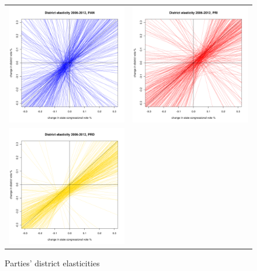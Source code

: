 \documentclass[letter,12pt]{article}
\begin{document}
\begin{figure}
\begin{center}
  \begin{tabular}{cc}
    \includegraphics[width=.4\columnwidth]{elastpand0.pdf} & \includegraphics[width=.4\columnwidth]{elastprid0.pdf} \\
    \includegraphics[width=.4\columnwidth]{elastprdd0.pdf} &  \\
  \end{tabular}
  \caption{Parties' district elasticities}\label{F:malmgnat}
\end{center}
\end{figure}



%


\end{document}
